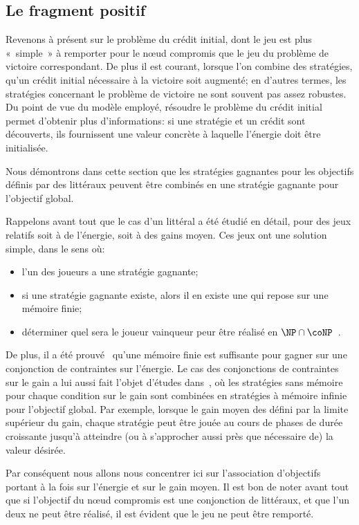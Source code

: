 \subsection{Le fragment positif}

Revenons à présent sur le problème du crédit initial, dont le jeu est plus « simple » à remporter pour le nœud compromis que le jeu du problème de victoire correspondant.
De plus il est courant, lorsque l'on combine des stratégies, qu'un crédit initial nécessaire à la victoire soit augmenté; en d'autres termes, les stratégies concernant le problème de victoire ne sont souvent pas assez robustes.
Du point de vue du modèle employé, résoudre le problème du crédit initial permet d'obtenir plus d'informations: si une stratégie et un crédit sont découverts, ils fournissent une valeur concrète à laquelle l'énergie doit être initialisée.

\bigskip

Nous démontrons dans cette section que les stratégies gagnantes pour les objectifs définis par des littéraux peuvent être combinés en une stratégie gagnante pour l'objectif global.

Rappelons avant tout que le cas d'un littéral a été étudié en détail, pour des jeux relatifs soit à de l'énergie, soit à des gains moyen.
Ces jeux ont une solution simple, dans le sens où:
\begin{itemize}
    \item l'un des joueurs a une stratégie gagnante;
    \item si une stratégie gagnante existe, alors il en existe une qui repose sur une mémoire finie;
    \item déterminer quel sera le joueur vainqueur peur être réalisé en $\NP\cap \coNP$~\cite{zwick96}.
\end{itemize}
De plus, il a été prouvé~\cite{velner12a} qu'une mémoire finie est suffisante pour gagner sur une conjonction de contraintes sur l'énergie.
Le cas des conjonctions de contraintes sur le gain a lui aussi fait l'objet d'études dans~\cite{velner12a}, où les stratégies sans mémoire pour chaque condition sur le gain sont combinées en stratégies à mémoire infinie pour l'objectif global.
Par exemple, lorsque le gain moyen des défini par la limite supérieur du gain, chaque stratégie peut être jouée au cours de phases de durée croissante jusqu'à atteindre (ou à s'approcher aussi près que nécessaire de) la valeur désirée.

Par conséquent nous allons nous concentrer ici sur l'association d'objectifs portant à la fois sur l'énergie et sur le gain moyen.
Il est bon de noter avant tout que si l'objectif du nœud compromis est une conjonction de littéraux, et que l'un deux ne peut être réalisé, il est évident que le jeu ne peut être remporté.

